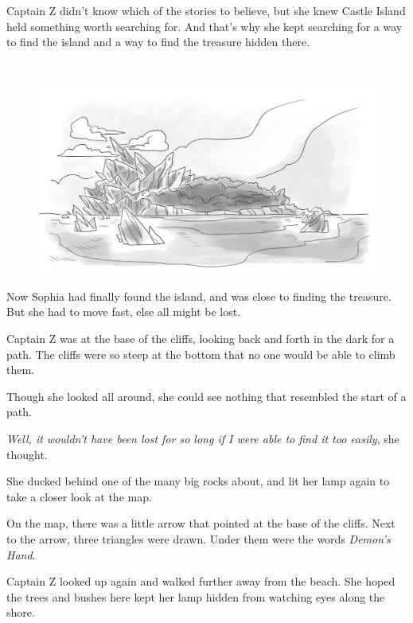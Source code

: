 \documentclass[12pt]{extbook}
\begin{document}
  Captain Z didn't know which of the stories to believe, but she knew
  Castle Island held something worth searching for. And that's why she
  kept searching for a way to find the island and a way to find the
  treasure hidden there.
  
  \section{}\label{section-14}
  
  \begin{figure}[htbp]
  \centering
  \includegraphics{img/castle_island.png}
  \caption{}
  \end{figure}
  
  Now Sophia had finally found the island, and was close to finding the
  treasure. But she had to move fast, else all might be lost.
  
  Captain Z was at the base of the cliffs, looking back and forth in the
  dark for a path. The cliffs were so steep at the bottom that no one
  would be able to climb them.
  
  Though she looked all around, she could see nothing that resembled the
  start of a path.
  
  \emph{Well, it wouldn't have been lost for so long if I were able to
  find it too easily}, she thought.
  
  She ducked behind one of the many big rocks about, and lit her lamp
  again to take a closer look at the map.
  
  On the map, there was a little arrow that pointed at the base of the
  cliffs. Next to the arrow, three triangles were drawn. Under them were
  the words \emph{Demon's Hand}.
  
  Captain Z looked up again and walked further away from the beach. She
  hoped the trees and bushes here kept her lamp hidden from watching eyes
  along the shore.
  
\end{document}
